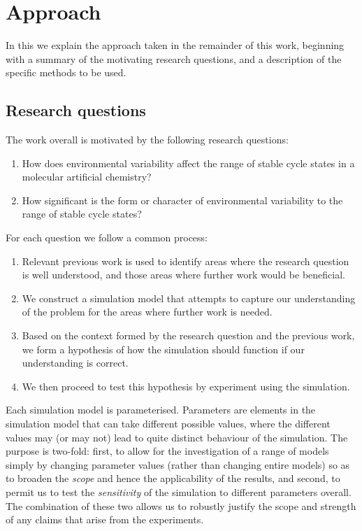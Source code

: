 \section{Approach}\label{methods}

In this  we explain the approach taken in the remainder of this work, beginning with a summary of the motivating research questions, and a description of the specific methods to be used.

\subsection{Research questions}\label{research-questions}

The work overall is motivated by the following research questions:

\vspace{0.3cm}
\begin{minipage}[l]{0.95\textwidth}
	\begin{enumerate}[label=RQ\arabic*:]
		\item How does environmental variability affect the range of stable cycle states in a molecular artificial chemistry?
		\item How significant is the form or character of environmental variability to the range of stable cycle states?
	\end{enumerate}
\end{minipage}
\vspace{0.3cm}

For each question we follow a common process:
\begin{enumerate}
	\item Relevant previous work is used to identify areas where the research question is well understood, and those areas where further work would be beneficial.
	\item We construct a simulation model that attempts to capture our understanding of the problem for the areas where further work is needed.
	\item Based on the context formed by the research question and the previous work, we form a hypothesis of how the simulation should function if our understanding is correct.
	\item We then proceed to test this hypothesis by experiment using the simulation.
\end{enumerate}

Each simulation model is parameterised. Parameters are elements in the simulation model that can take different possible values, where the different values may (or may not) lead to quite distinct behaviour of the simulation. The purpose is two-fold: first, to allow for the investigation of a range of models simply by changing parameter values (rather than changing entire models) so as to broaden the \emph{scope} and hence the applicability of the results, and second, to permit us to test the \emph{sensitivity} of the simulation to different parameters overall. The combination of these two allows us to robustly justify the scope and strength of any claims that arise from the experiments.

